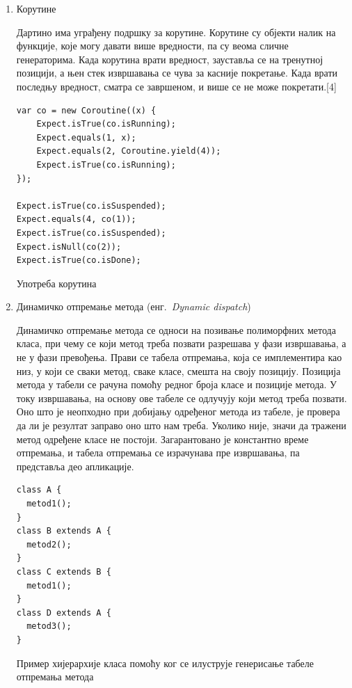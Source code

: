 \documentclass[12pt,oneside]{memoir}
\begin{document}
\begin{enumerate}
\item Корутине

Дартино има уграђену подршку за корутине. Корутине су објекти налик на функције, које могу давати више вредности, па су веома сличне генераторима. Када корутина врати вредност, зауставља се на тренутној позицији, а њен стек извршавања се чува за касније покретање. Када врати последњу вредност, сматра се завршеном, и више се не може покретати.[4]%

\begin{listing}
\begin{verbatim}
var co = new Coroutine((x) {
    Expect.isTrue(co.isRunning);
    Expect.equals(1, x);
    Expect.equals(2, Coroutine.yield(4));
    Expect.isTrue(co.isRunning);
});

Expect.isTrue(co.isSuspended);
Expect.equals(4, co(1));
Expect.isTrue(co.isSuspended);
Expect.isNull(co(2));
Expect.isTrue(co.isDone);
\end{verbatim}
\caption{Употреба корутина}
\label{coroutines}
\end{listing}

\item Динамичко отпремање метода (енг.~\textit{Dynamic dispatch})

Динамичко отпремање метода се односи на позивање полиморфних метода класа, при чему се који метод треба позвати разрешава у фази извршавања, а не у фази превођења. Прави се табела отпремања, која се имплементира као низ, у који се сваки метод, сваке класе, смешта на своју позицију. Позиција метода у табели се рачуна помоћу редног броја класе и позиције метода. У току извршавања, на основу ове табеле се одлучују који метод треба позвати. Оно што је неопходно при добијању одређеног метода из табеле, је провера да ли је резултат заправо оно што нам треба. Уколико није, значи да тражени метод одређене класе не постоји. Загарантовано је константно време отпремања, и табела отпремања се израчунава пре извршавања, па представља део апликације.

\begin{listing}
\begin{verbatim}
class A {
  metod1();
}
class B extends A {
  metod2();
}
class C extends B {
  metod1();
}
class D extends A {
  metod3();
}
\end{verbatim}
\caption{Пример хијерархије класа помоћу ког се илуструје генерисање табеле отпремања метода}
\label{dispatchTable}
\end{listing}


\end{enumerate}
\end{document}
